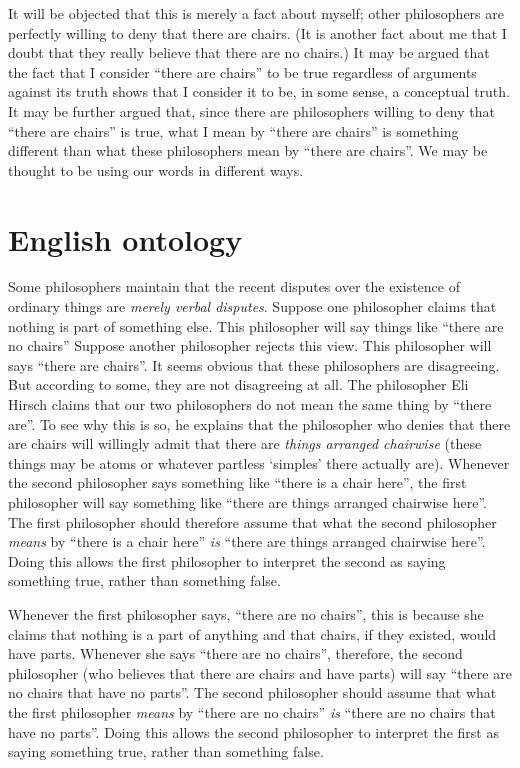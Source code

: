 \documentclass[11pt]{article}
\begin{document}
\begin{spacing}{1.25}
It will be objected that this is merely a fact about myself; other
philosophers are perfectly willing to deny that there are chairs.  (It
is another fact about me that I doubt that they really believe that
there are no chairs.)  It may be argued that the fact that I consider
``there are chairs'' to be true regardless of arguments against its
truth shows that I consider it to be, in some sense, a conceptual
truth.  It may be further argued that, since there are philosophers
willing to deny that ``there are chairs'' is true, what I mean by
``there are chairs'' is something different than what these
philosophers mean by ``there are chairs''.  We may be thought to be
using our words in different ways.

\section{English ontology}
Some philosophers maintain that the recent disputes over the existence
of ordinary things are {\em merely verbal disputes}.  Suppose one
philosopher claims that nothing is part of something else.  This
philosopher will say things like ``there are no chairs'' Suppose
another philosopher rejects this view.  This philosopher will says
``there are chairs''.  It seems obvious that these philosophers are
disagreeing.  But according to some, they are not disagreeing at all.
The philosopher Eli Hirsch claims that our two philosophers do not
mean the same thing by ``there are''.  To see why this is so, he
explains that the philosopher who denies that there are chairs will
willingly admit that there are {\em things arranged chairwise} (these
things may be atoms or whatever partless `simples' there actually
are).  Whenever the second philosopher says something like ``there is
a chair here'', the first philosopher will say something like ``there
are things arranged chairwise here''.  The first philosopher should
therefore assume that what the second philosopher {\em means} by
``there is a chair here'' {\em is} ``there are things arranged
chairwise here''.  Doing this allows the first philosopher to
interpret the second as saying something true, rather than something
false.

Whenever the first philosopher says, ``there are no chairs'', this is
because she claims that nothing is a part of anything and that chairs,
if they existed, would have parts.  Whenever she says ``there are no
chairs'', therefore, the second philosopher (who believes that there
are chairs and have parts) will say ``there are no chairs that have no
parts''.  The second philosopher should assume that what the first
philosopher {\em means} by ``there are no chairs'' {\em is} ``there
are no chairs that have no parts''.  Doing this allows the second
philosopher to interpret the first as saying something true, rather
than something false.


\end{spacing}
\end{document}
